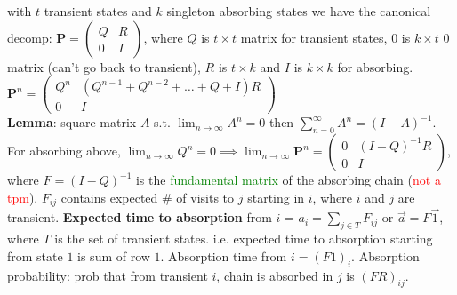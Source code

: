 \documentclass[10pt,landscape]{article}
\begin{document}
\begin{multicols*}{3}
with $t$ transient states and $k$ singleton absorbing states
we have the canonical decomp: $\mathbf{P} =
\begin{pmatrix}
  Q & R
  \\ 0 & I
\end{pmatrix}
$, where $Q$ is $t \times t$ matrix for transient states, $0$ is $k
\times t$ 0 matrix (can't go back to transient), $R$ is $t \times k$
and $I$ is $k \times k$ for absorbing. $\mathbf{P}^n =
\begin{pmatrix}
  Q^n & (Q^{n-1} + Q^{n-2} + \ldots + Q + I) R
  \\ 0 & I
\end{pmatrix}
$
\\ \textbf{Lemma}: square matrix $A$ s.t. $\lim_{n \to \infty} A^n =
0$ then $\sum_{n=0}^{\infty}A^n = (I - A)^{-1}$. For absorbing above,
$\lim_{n\to \infty}Q^n = 0 \implies \lim_{n \to \infty} \mathbf{P}^n =
\begin{pmatrix}
  0 & (I-Q)^{-1}R
  \\ 0 & I
\end{pmatrix}
$, where $F = (I-Q)^{-1}$ is the \textcolor{green}{fundamental matrix}
of the absorbing chain (\textcolor{red}{not a tpm}). $F_{ij}$ contains
expected \# of visits to $j$ starting in $i$, where $i$ and $j$ are
transient. \textbf{Expected time to absorption} from $i$ = $a_i =
\sum_{j \in T}F_{ij}$ or $\vec{a} = F \vec{1}$, where $T$ is the set
of transient states. i.e. expected time to
absorption starting from state $1$ is sum of row $1$. Absorption time
from $i= (F1)_i$. Absorption probability: prob that from transient
$i$, chain is absorbed in $j$ is $(FR)_{ij}$.
\end{multicols*}
\end{document}
